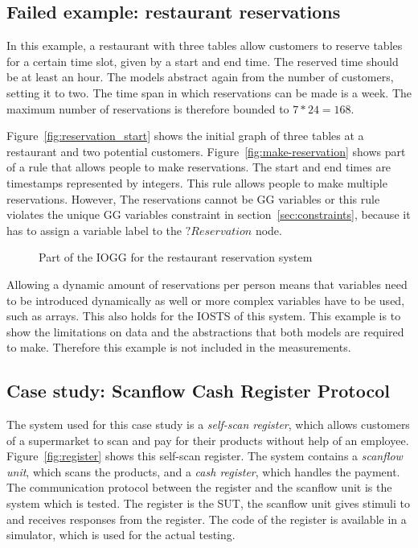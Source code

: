\subsection{Failed example: restaurant reservations}
In this example, a restaurant with three tables allow customers to reserve tables for a certain time slot, given by a start and end time. The reserved time should be at least an hour. The models abstract again from the number of customers, setting it to two. The time span in which reservations can be made is a week. The maximum number of reservations is therefore bounded to $7*24=168$.

Figure~\ref{fig:reservation_start} shows the initial graph of three tables at a restaurant and two potential customers. Figure~\ref{fig:make-reservation} shows part of a rule that allows people to make reservations. The start and end times are timestamps represented by integers. This rule allows people to make multiple reservations. However, The reservations cannot be GG variables or this rule violates the unique GG variables constraint in section~\ref{sec:constraints}, because it has to assign a variable label to the $?Reservation$ node.

\begin{figure}[ht]
  \begin{center}
    \hspace{20px}
  \end{center}
  \caption{Part of the IOGG for the restaurant reservation system}
  \label{fig:gg-reservation}
\end{figure}

Allowing a dynamic amount of reservations per person means that variables need to be introduced dynamically as well or more complex variables have to be used, such as arrays. This also holds for the IOSTS of this system. This example is to show the limitations on data and the abstractions that both models are required to make. Therefore this example is not included in the measurements. 

\subsection{Case study: Scanflow Cash Register Protocol}
The system used for this case study is a \textit{self-scan register}, which allows customers of a supermarket to scan and pay for their products without help of an employee. Figure~\ref{fig:register} shows this self-scan register. The system contains a \textit{scanflow unit}, which scans the products, and a \textit{cash register}, which handles the payment. The communication protocol between the register and the scanflow unit is the system which is tested. The register is the SUT, the scanflow unit gives stimuli to and receives responses from the register. The code of the register is available in a simulator, which is used for the actual testing.

